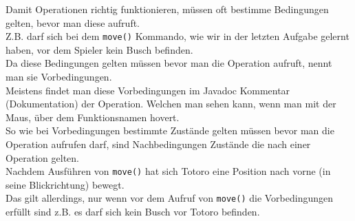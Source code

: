 \begin{Infobox}
    Damit Operationen richtig funktionieren, müssen oft bestimme Bedingungen gelten, bevor man diese aufruft.\\
Z.B. darf sich bei dem \lstinline{move()} Kommando, wie wir in der letzten Aufgabe gelernt haben, vor dem Spieler kein Busch befinden.\\
Da diese Bedingungen gelten müssen bevor man die Operation aufruft, nennt man sie Vorbedingungen.\\
Meistens findet man diese Vorbedingungen im Javadoc Kommentar (Dokumentation) der Operation. Welchen man sehen kann, wenn man mit der Maus, über dem Funktionsnamen hovert.\\

So wie bei Vorbedingungen bestimmte Zustände gelten müssen bevor man die Operation aufrufen darf, sind Nachbedingungen Zustände die nach einer Operation gelten.\\
Nachdem Ausführen von \lstinline{move()} hat sich Totoro eine Position nach vorne (in seine Blickrichtung) bewegt.\\
Das gilt allerdings, nur wenn vor dem Aufruf von \lstinline{move()} die Vorbedingungen erfüllt sind z.B. es darf sich kein Busch vor Totoro befinden.\\


\end{Infobox}
